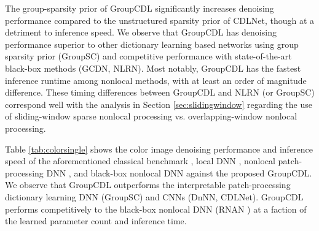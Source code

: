 \documentclass[lettersize,journal]{IEEEtran}
\newcommand{\soa}{state-of-the-art }
\begin{document}
The group-sparsity prior of GroupCDL significantly increases
denoising performance compared to the unstructured sparsity prior of CDLNet, though at a detriment to inference speed. 
We observe that GroupCDL has denoising performance superior to other dictionary
learning based networks using group sparsity prior (GroupSC) and competitive performance with \soa
black-box methods (GCDN, NLRN). Most notably, GroupCDL has the fastest
inference runtime among nonlocal methods, with at least an order of magnitude
difference. These timing differences between GroupCDL and NLRN (or GroupSC)
correspond well with the analysis in Section \ref{sec:slidingwindow} regarding
the use of sliding-window sparse nonlocal processing vs. overlapping-window nonlocal
processing. 

Table \ref{tab:colorsingle} shows the color image denoising performance and
inference speed of the aforementioned classical benchmark \cite{bm3d, bm3d-gpu}, local DNN
\cite{DnCNN}, nonlocal patch-processing DNN \cite{lecouat2020nonlocal}, and black-box nonlocal
DNN \cite{zhang2019residual} against the proposed GroupCDL. We observe that
GroupCDL outperforms the interpretable patch-processing dictionary learning
DNN (GroupSC) and CNNs (DnNN, CDLNet). GroupCDL performs competitively to the black-box nonlocal DNN (RNAN \cite{zhang2019residual}) at a faction of the learned parameter count and inference time.
\end{document}
